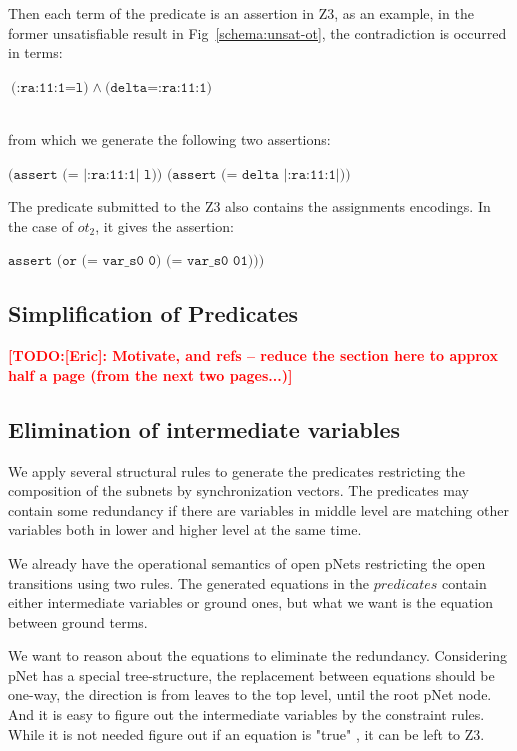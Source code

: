 \documentclass{lncs/llncs}
\newcommand{\TODO}[1]{\textcolor{red}{\textbf{[TODO:#1]}}}
\newcommand{\OTvar}{\texttt}
\newcommand{\OTland}{\;\land\ }
\newcommand{\QIN}[1]{\textcolor{airforceblue}{#1}}
\begin{document}
\noindent Then each term of the
predicate is an assertion in Z3, as an example, in the former
unsatisfiable result in Fig~\ref{schema:unsat-ot}, the contradiction is occurred in terms: \\
\centerline{$\OTvar{(:ra:11:1=l)} \OTland \OTvar{(delta=:ra:11:1)}$}\\
from which we generate the following two assertions:\\
\centerline{$\OTvar{(assert\ (=\ |:ra:11:1|\ l))\ \ \ (assert\ (=\ delta\ |:ra:11:1|))}$}

\noindent The predicate submitted to the Z3 also contains the
assignments encodings.
In the case of $ot_2$, it
gives the assertion:\\
\centerline{$\OTvar{assert (or (= var\_s0 0) (= var\_s0 01)))}$}

\subsection{Simplification of Predicates}
\TODO{[Eric]: Motivate, and refs  -- reduce the section here to approx
  half a page (from the next two pages...)} 

\subsection{Elimination of intermediate variables}

\QIN{
We apply several structural rules to generate the predicates restricting the composition of the subnets by synchronization vectors.
The predicates may contain some redundancy if there are variables in middle level are matching other variables both in lower and higher level at the same time. 
}

We already have the operational semantics of open pNets restricting the open transitions using two rules.
The generated equations in the $predicates$ contain either intermediate variables or ground ones, but what we want is the equation between ground terms. 

\QIN{
We want to reason about the equations to eliminate the redundancy. 
Considering pNet has a special tree-structure, the replacement between equations should be one-way, the direction is from leaves to the top level, until the root pNet node. 
And it is easy to figure out the intermediate variables by the constraint rules.
While it is not needed figure out if an equation is "true" , it can be left to Z3.
}
\end{document}
